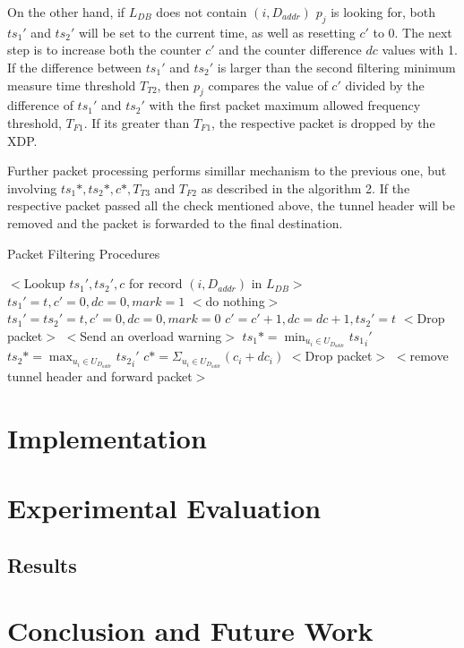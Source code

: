 \documentclass[sigplan,screen]{acmart}
\begin{document}
On the other hand, if $L_{DB}$ does not contain $(i, D_{addr})$ $p_j$ is looking for, both $ts_1'$ and $ts_2'$ will be set to the current time, as well as resetting $c'$ to 0. The next step is to increase both the counter $c'$ and the counter difference $dc$ values with 1. If the difference between $ts_1'$ and $ts_2'$ is larger than the second filtering minimum measure time threshold $T_{T2}$, then $p_j$ compares the value of $c'$ divided by the difference of $ts_1'$ and $ts_2'$ with the first packet maximum allowed frequency threshold, $T_{F1}$. If its greater than $T_{F1}$, the respective packet is dropped by the XDP. 

Further packet processing performs simillar mechanism to the previous one, but involving $ts_1*, ts_2*, c*, T_{T3}$ and $T_{F2}$ as described in the algorithm 2. If the respective packet passed all the check mentioned above, the tunnel header will be removed and the packet is forwarded to the final destination.  
\begin{algorithm}
\caption{Packet Filtering Procedures}
\begin{algorithmic}[1]
\State $<$Lookup $ts_1', ts_2',c$ for record $(i,D_{addr})$ in $L_{DB}>$
		\State $ts_1'=t,c'=0,dc=0,mark=1$
	\Else
		\State $<$do nothing$>$
	\EndIf
\Else
\State $ts_1'=ts_2'=t, c'=0, dc=0, mark=0$
\EndIf
\State $c'=c'+1, dc=dc+1, ts_2'=t$
		\State $<$Drop packet$>$
		\State $<$Send an overload warning$>$
	\EndIf
\EndIf
\State $ts_1* = \min_{u_i \in U_{D_{addr}}} {ts_1}_i'$
\State $ts_2* = \max_{u_i \in U_{D_{addr}}} {ts_2}_i'$
\State $c* = \Sigma_{u_i \in U_{D_{addr}}} (c_i+dc_i)$
		\State $<$Drop packet$>$
	\EndIf
\EndIf
\State $<$remove tunnel header and forward packet$>$
\end{algorithmic}
\end{algorithm}

\section{Implementation}

\section{Experimental Evaluation}

\subsection{Results}

\section{Conclusion and Future Work}



\end{document}
